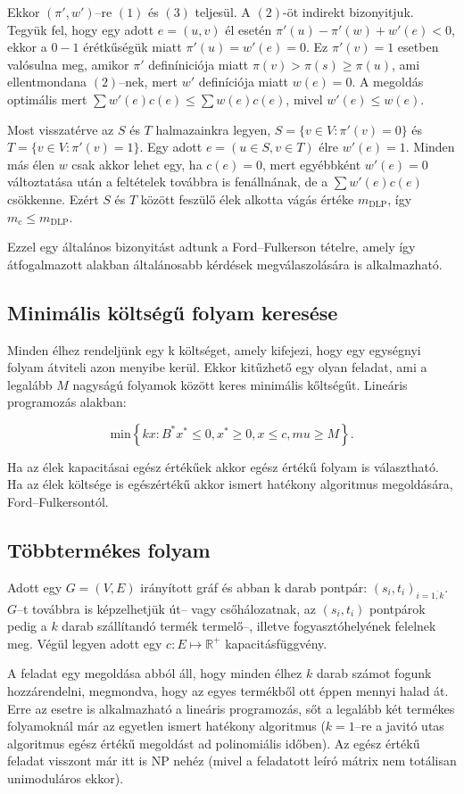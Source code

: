Ekkor $(\pi',w')$--re $(1)$ és $(3)$ teljesül. A $(2)$-öt indirekt bizonyitjuk.
Tegyük fel, hogy egy adott $e=(u,v)$ él esetén $\pi'(u)-\pi'(w)+w'(e)<0$, ekkor
a $0-1$ érétkűségük miatt $\pi'(u)=w'(e)=0$. Ez $\pi'(v)=1$ esetben valósulna
meg, amikor $\pi'$ definíniciója miatt $\pi(v) > \pi(s) \geq \pi(u)$, ami
ellentmondana $(2)$--nek, mert $w'$ definíciója miatt $w(e)=0$. A megoldás
optimális mert $\sum w'(e)c(e) \leq \sum w(e)c(e)$, mivel $w'(e) \leq w(e)$.

Most visszatérve az $S$ és $T$ halmazainkra legyen, $S=\{v \in V: \pi'(v)=0\} $
és $T=\{v \in V: \pi'(v)=1\}$. Egy adott $e=(u \in S, v \in T)$ élre $w'(e)=1$.
Minden más élen $w$ csak akkor lehet egy, ha $c(e)=0$, mert egyébbként $w'(e)=0$
változtatása után a feltételek továbbra is fenállnának, de a $\sum w'(e)c(e)$
csökkenne. Ezért $S$ és $T$ között feszülő élek alkotta vágás értéke
$m_{\mbox{DLP}}$, így $m_{\mbox{c}} \leq m_{\mbox{DLP}}$.

Ezzel egy általános bizonyitást adtunk a Ford--Fulkerson tételre, amely így
átfogalmazott alakban általánosabb kérdések megválaszolására is alkalmazható.

\subsection{Minimális költségű folyam keresése}

Minden élhez rendeljünk egy k költséget, amely kifejezi, hogy egy egységnyi folyam
átviteli azon menyibe kerül. Ekkor kitűzhető egy olyan feladat, ami a legalább $M$
nagyságú folyamok között keres minimális kőltségűt. Lineáris programozás alakban:

\[ \mbox{min} \left\{kx: B^*x^* \leq 0, x^* \geq 0, x \leq c,mu \geq M \right\}. \]

Ha az élek kapacitásai egész értékűek akkor egész értékű folyam is választható.
Ha az élek költsége is egészértékű akkor ismert hatékony algoritmus megoldására,
Ford--Fulkersontól.

\subsection{Többtermékes folyam}

Adott egy $G=(V,E)$ irányított gráf és abban k darab pontpár:
$(s_i,t_i)_{i = \overline{1,k}}$. $G$--t továbbra is képzelhetjük út-- vagy
csőhálozatnak, az $(s_i, t_i)$ pontpárok pedig a $k$ darab szállítandó termék
termelő--, illetve fogyasztóhelyének felelnek meg. Végül legyen adott egy $c:E
\mapsto \mathbb{R}^+$ kapacitásfüggvény.

A feladat egy megoldása abból áll, hogy minden élhez $k$ darab számot fogunk
hozzárendelni, megmondva, hogy az egyes termékből ott éppen mennyi halad át.
Erre az esetre is alkalmazható a lineáris programozás, sőt a legalább két
termékes folyamoknál már az egyetlen ismert hatékony algoritmus ($k=1$--re a
javitó utas algoritmus egész értékű megoldást ad polinomiális időben). Az egész
értékű feladat visszont már itt is NP nehéz (mivel a feladatott leíró mátrix nem
totálisan unimoduláros ekkor).